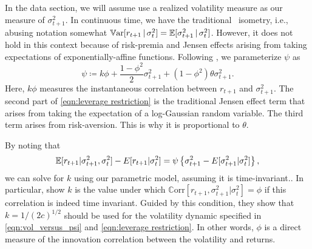 \documentclass[11pt, letterpaper, twoside]{article}
\begin{document}
In the data section, we will assume use a realized volatility measure as our measure of $\sigma^2_{t+1}$.
In continuous time, we have the traditional \Ito\ isometry, i.e., abusing notation somewhat $\operatorname{\mathbb{V}ar}[r_{t+1} \,\vert\, \sigma^2_t] = \operatorname{\mathbb{E}}[\sigma^2_{t+1} \,\vert\, \sigma^2_t]$.
However, it does not hold in this context because of risk-premia and Jensen effects arising from  taking expectations of exponentially-affine functions. 
Following \textcite{han2018leverage}, we parameterize $\psi$ as 
%
\begin{equation}
    \label{eqn:leverage restriction}
    \psi \coloneqq k \phi + \frac{1 - \phi^2}{2} \sigma^2_{t+1} + (1-\phi^2) \theta \sigma^2_{t+1}.
\end{equation}
%
Here, $k \phi$ measures the instantaneous correlation between $r_{t+1}$ and $\sigma^2_{t+1}$.  The second part of \cref{eqn:leverage restriction} is the traditional Jensen effect term that arises from taking the expectation of a log-Gaussian random variable.  The third term arises from risk-aversion. This is why it is proportional to $\theta$.

By noting that 
%
\begin{equation}
    \operatorname{\mathbb{E}}[r_{t+1}|\sigma _{t+1}^{2},\sigma _{t}^{2}]-E[r_{t+1}|\sigma _{t}^{2}]=\psi \left \{ \sigma _{t+1}^{2}-E[\sigma _{t+1}^{2}|\sigma _{t}^{2}]\right \},
    \label{eqn:vol_versus_psi}
\end{equation}
%
we can solve for $k$ using our parametric model, assuming it is time-invariant..
In particular, \textcite{han2018leverage} show $k$ is the value under which $\mathbb{C}\mathrm{orr}[r_{t+1},\sigma _{t+1}^{2}|\sigma _{t}^{2}]=\phi $ if this correlation is indeed time invariant. Guided by this condition, they show that $k=1/(2c)^{1/2}$ should be used for the volatility dynamic specified in \cref{eqn:vol_versus_psi}  and \cref{eqn:leverage restriction}.
In other words, $\phi$ is a direct measure of the innovation correlation between the volatility and returns.
\end{document}
